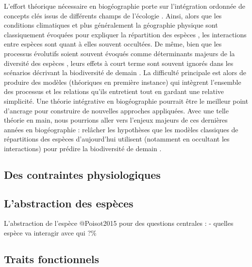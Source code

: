 L'effort théorique nécessaire en biogéographie porte sur l'intégration
ordonnée de concepts clés issus de différents champs de l'écologie
\cite{Thuiller2013}. Ainsi, alors que les conditions climatiques et plus
généralement la géographie physique sont classiquement évoquées pour
expliquer la répartition des espèces \cite{Kearney2004}, les
interactions entre espèces sont quant à elles souvent occultées. De
même, bien que les processus évolutifs soient souvent évoqués comme
déterminants majeurs de la diversité des espèces \cite{Rosindell2011},
leurs effets à court terme sont souvent ignorés \cite{Parmesan2006} dans
les scénarios décrivant la biodiversité de demain \cite{Lavergne2010}.
La difficulté principale est alors de produire des modèles (théoriques
en première instance) qui intègrent l'ensemble des processus et les
relations qu'ils entretient \cite{Thuiller2013} tout en gardant une
relative simplicité. Une théorie intégrative en biogéographie pourrait
être le meilleur point d'ancrage pour construire de nouvelles approches
appliquées. Avec une telle théorie en main, nous pourrions aller vers
l'enjeux majeurs de ces dernières années en biogéographie : relâcher les
hypothèses que les modèles classiques de répartitions des espèces
d'aujourd'hui utilisent (notamment en occultant les interactions) pour
prédire la biodiversité de demain \cite{Guisan2011}.

\subsection*{Des contraintes
physiologiques}\label{des-contraintes-physiologiques}

\subsection{L'abstraction des
espèces}\label{labstraction-des-espuxe8ces}

L'abstraction de l'espèce @Poisot2015 pour des questions centrales : -
quelles espèce va interagir avce qui ?\%

\subsection*{Traits fonctionnels}\label{traits-fonctionnels}


